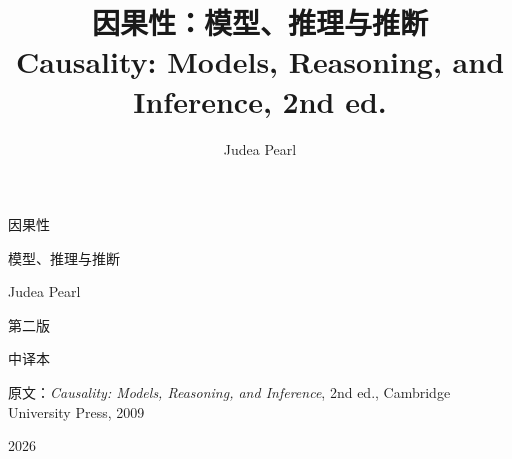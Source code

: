 \documentclass[UTF8,11pt,openany,fontset=windows]{ctexbook}
\title{\heiti 因果性：模型、推理与推断\\[6pt]\large\mdseries Causality: Models, Reasoning, and Inference, 2nd ed.}
\author{Judea Pearl}
\date{}
\begin{document}
\frontmatter
\pagestyle{empty}
\begin{titlepage}
\centering
\vspace*{3cm}
{\heiti{} 因果性\par}
\vspace{0.6cm}
{\heiti{} 模型、推理与推断\par}
\vspace{1.6cm}
{\Large Judea Pearl\par}
\vspace{0.4cm}
{\large 第二版\par}
\vspace{1.2cm}
{\kaishu 中译本\par}
\vspace{1.5cm}
{\small 原文：\textit{Causality: Models, Reasoning, and Inference}, 2nd ed., Cambridge University Press, 2009\par}
\vfill
{\small 2026\par}
\end{titlepage}

\pagestyle{plain}
\tableofcontents

\mainmatter













\end{document}
